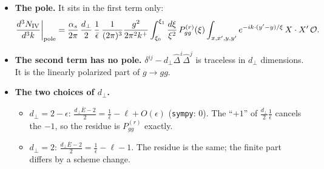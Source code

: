 \documentclass[10pt]{article}
\numberwithin{equation}{section}
\newcommand{\Dh}{\hat\Delta}
\newcommand{\OO}{\mathcal O}
\newcommand{\pre}{\frac{1}{(2\pi)^3}\frac{g^2}{2\pi^2k^+}}
\begin{document}
\begin{itemize}
\item \textbf{The pole.} It sits in the first term only:
\begin{equation}
\frac{d^3N_{\rm IV}}{d^3k}\bigg|_{\rm pole}=\frac{\alpha_s}{2\pi}\,\frac{d_\perp}{2}\,\frac{1}{\bar\epsilon}\,\pre\int_{\xi_0}^{\xi_1}\frac{d\xi}{\xi^2}\,P^{(r)}_{gg}(\xi)\int_{x,x',y,y'}e^{-ik\cdot(y'-y)/\xi}\,X\cdot X'\,\OO .
\label{eq:pole}
\end{equation}
\item \textbf{The second term has no pole.} $\delta^{ij}-d_\perp\Dh^i\Dh^j$ is traceless in $d_\perp$ dimensions. It is the linearly polarized part of $g\to gg$.
\item \textbf{The two choices of $d_\perp$.}
\begin{itemize}
\item $d_\perp=2-\epsilon$: $\frac{d_\perp\bar E-2}{2}=\frac1{\bar\epsilon}-\ell+O(\epsilon)$ (\texttt{sympy}: $0$). The ``$+1$'' of $\frac{d_\perp}{2}\frac{1}{\bar\epsilon}$ cancels the $-1$, so the residue is $P^{(r)}_{gg}$ exactly.
\item $d_\perp=2$: $\frac{d_\perp\bar E-2}{2}=\frac1{\bar\epsilon}-\ell-1$. The residue is the same; the finite part differs by a scheme change.
\end{itemize}
\end{itemize}

\end{document}
